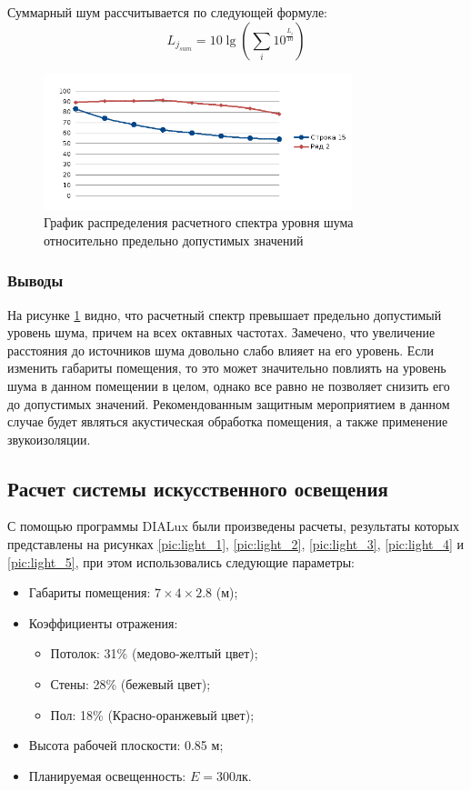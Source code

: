 Суммарный шум рассчитывается по следующей формуле:
$$ L_{j_{sum}} = 10\lg{(\sum_{i} 10^{\frac{L_i}{10}})} $$

\begin{figure}[bth]
\centering
\includegraphics[width=0.8\textwidth]{noise_graph}
\caption{График распределения расчетного спектра уровня шума относительно предельно допустимых значений}
\label{pic:noise_graph}
\end{figure}

\subsubsection*{Выводы}
На рисунке \ref{pic:noise_graph} видно, что расчетный спектр превышает предельно допустимый уровень шума, причем на всех октавных частотах.
Замечено, что увеличение расстояния до источников шума довольно слабо влияет на его уровень.
Если изменить габариты помещения, то это может значительно повлиять на уровень шума в данном помещении в целом,
однако все равно не позволяет снизить его до допустимых значений. Рекомендованным защитным мероприятием в данном
случае будет являться акустическая обработка помещения, а также применение звукоизоляции.

\subsection{Расчет системы искусственного освещения}

С помощью программы DIALux были произведены расчеты, результаты которых представлены на рисунках \ref{pic:light_1},
\ref{pic:light_2}, \ref{pic:light_3}, \ref{pic:light_4} и \ref{pic:light_5}, при этом использовались
следующие параметры:
\begin{itemize}
    \item Габариты помещения: $ 7 \times 4 \times 2.8 $ (м);
    \item Коэффициенты отражения:
        \begin{itemize}
            \item Потолок: 31\% (медово-желтый цвет);
            \item Стены: 28\% (бежевый цвет);
            \item Пол: 18\% (Красно-оранжевый цвет);
        \end{itemize}
    \item Высота рабочей плоскости: 0.85 м;
    \item Планируемая освещенность: $ E = 300 лк. $
\end{itemize}

